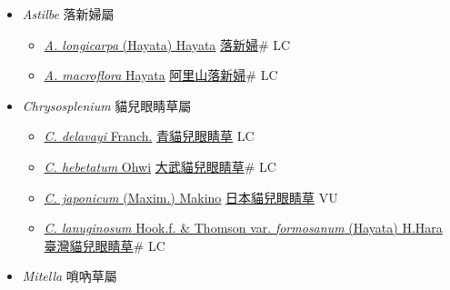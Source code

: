 
  \begin{itemize}
 \item[] \textit{Astilbe} 落新婦屬
                    
  \begin{itemize}
        \item[] \href{http://www.theplantlist.org/tpl1.1/search?q=Astilbe+longicarpa}{\textit{A. longicarpa} (Hayata) Hayata}   \href{\detokenize{http://taibnet.sinica.edu.tw/chi/taibnet_species_list.php?T2=落新婦&T2_new_value=true&fr=y}}{落新婦}\# LC
        \item[] \href{http://www.theplantlist.org/tpl1.1/search?q=Astilbe+macroflora}{\textit{A. macroflora} Hayata}   \href{\detokenize{http://taibnet.sinica.edu.tw/chi/taibnet_species_list.php?T2=阿里山落新婦&T2_new_value=true&fr=y}}{阿里山落新婦}\# LC
  \end{itemize}
 \item[] \textit{Chrysosplenium} 貓兒眼睛草屬
                    
  \begin{itemize}
        \item[] \href{http://www.theplantlist.org/tpl1.1/search?q=Chrysosplenium+delavayi}{\textit{C. delavayi} Franch.}   \href{\detokenize{http://taibnet.sinica.edu.tw/chi/taibnet_species_list.php?T2=青貓兒眼睛草&T2_new_value=true&fr=y}}{青貓兒眼睛草} LC
        \item[] \href{http://www.theplantlist.org/tpl1.1/search?q=Chrysosplenium+hebetatum}{\textit{C. hebetatum} Ohwi}   \href{\detokenize{http://taibnet.sinica.edu.tw/chi/taibnet_species_list.php?T2=大武貓兒眼睛草&T2_new_value=true&fr=y}}{大武貓兒眼睛草}\# LC
        \item[] \href{http://www.theplantlist.org/tpl1.1/search?q=Chrysosplenium+japonicum}{\textit{C. japonicum} (Maxim.) Makino}   \href{\detokenize{http://taibnet.sinica.edu.tw/chi/taibnet_species_list.php?T2=日本貓兒眼睛草&T2_new_value=true&fr=y}}{日本貓兒眼睛草} VU
        \item[] \href{http://www.theplantlist.org/tpl1.1/search?q=Chrysosplenium+lanuginosum+var.+formosanum}{\textit{C. lanuginosum} Hook.f. \& Thomson var. \textit{formosanum} (Hayata) H.Hara}   \href{\detokenize{http://taibnet.sinica.edu.tw/chi/taibnet_species_list.php?T2=臺灣貓兒眼睛草&T2_new_value=true&fr=y}}{臺灣貓兒眼睛草}\# LC
  \end{itemize}
 \item[] \textit{Mitella} 嗩吶草屬
                    

\end{itemize}
